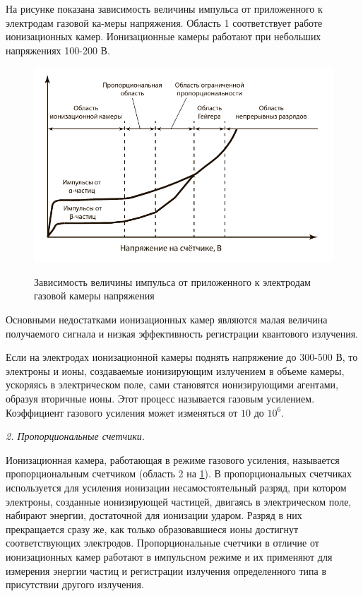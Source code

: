 \documentclass[14pt,pscyr,titlepage]{hedreport}
\begin{document}
		На рисунке показана зависимость величины импульса от приложенного к 
		электродам газовой ка-меры напряжения. Область 1 соответствует работе 
		ионизационных камер. Ионизационные камеры работают при небольших 
		напряжениях 100-200 В.

		\begin{figure}[h!]
			\center
			\includegraphics[width=.8\textwidth]{counter_graph} \\
			\caption{Зависимость величины импульса от приложенного к электродам 
				газовой камеры напряжения}
			\label{img:graph}
		\end{figure}

		Основными недостатками ионизационных камер являются малая величина 
		получаемого сигнала и низкая эффективность регистрации квантового 
		излучения.

		Если на электродах ионизационной камеры поднять напряжение до 
		300-500 В, то электроны и ионы, создаваемые ионизирующим излучением в 
		объеме камеры, ускоряясь в электрическом поле, сами становятся 
		ионизирующими агентами, образуя вторичные ионы. Этот процесс 
		называется газовым усилением. Коэффициент газового усиления может 
		изменяться от \( 10 \) до \( 10^6 \).

		\emph{2. Пропорциональные счетчики. }

		Ионизационная камера, работающая в режиме газового усиления, 
		называется пропорциональным счетчиком (область 2 на \ref{img:graph}). 
		В пропорциональных счетчиках используется для усиления ионизации 
		несамостоятельный разряд, при котором электроны, созданные 
		ионизирующей частицей, двигаясь в электрическом поле, набирают 
		энергии, достаточной для ионизации ударом. Разряд в них прекращается 
		сразу же, как только образовавшиеся ионы достигнут соответствующих 
		электродов. Пропорциональные счетчики в отличие от ионизационных 
		камер работают в импульсном режиме и их применяют для измерения 
		энергии частиц и регистрации излучения определенного типа в 
		присутствии другого излучения.
\end{document}
